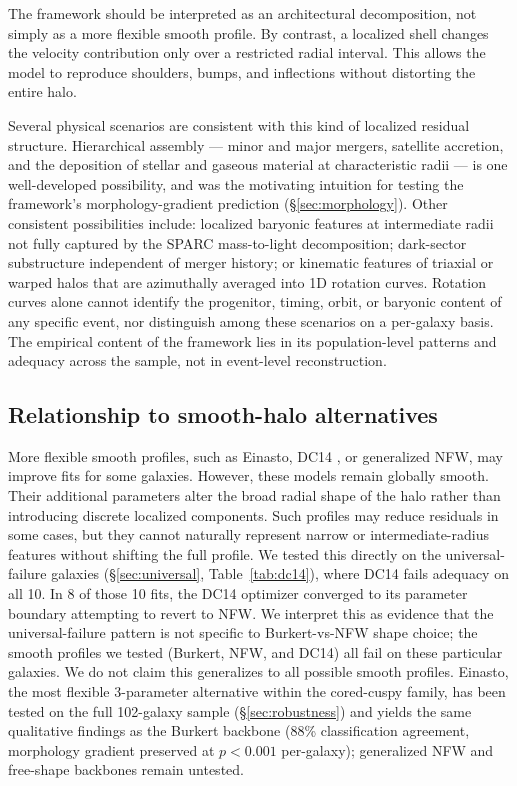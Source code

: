 The framework should be interpreted as an architectural decomposition, not simply as a more flexible smooth profile. By contrast, a localized shell changes the velocity contribution only over a restricted radial interval. This allows the model to reproduce shoulders, bumps, and inflections without distorting the entire halo.

Several physical scenarios are consistent with this kind of localized residual structure. Hierarchical assembly --- minor and major mergers, satellite accretion, and the deposition of stellar and gaseous material at characteristic radii --- is one well-developed possibility, and was the motivating intuition for testing the framework's morphology-gradient prediction (\S\ref{sec:morphology}). Other consistent possibilities include: localized baryonic features at intermediate radii not fully captured by the SPARC mass-to-light decomposition; dark-sector substructure independent of merger history; or kinematic features of triaxial or warped halos that are azimuthally averaged into 1D rotation curves. Rotation curves alone cannot identify the progenitor, timing, orbit, or baryonic content of any specific event, nor distinguish among these scenarios on a per-galaxy basis. The empirical content of the framework lies in its population-level patterns and adequacy across the sample, not in event-level reconstruction.

\subsection{Relationship to smooth-halo alternatives}

More flexible smooth profiles, such as Einasto, DC14 \citep{DiCintio2014a,DiCintio2014b}, or generalized NFW, may improve fits for some galaxies. However, these models remain globally smooth. Their additional parameters alter the broad radial shape of the halo rather than introducing discrete localized components. Such profiles may reduce residuals in some cases, but they cannot naturally represent narrow or intermediate-radius features without shifting the full profile. We tested this directly on the universal-failure galaxies (\S\ref{sec:universal}, Table~\ref{tab:dc14}), where DC14 fails adequacy on all 10. In 8 of those 10 fits, the DC14 optimizer converged to its parameter boundary attempting to revert to NFW. We interpret this as evidence that the universal-failure pattern is not specific to Burkert-vs-NFW shape choice; the smooth profiles we tested (Burkert, NFW, and DC14) all fail on these particular galaxies. We do not claim this generalizes to all possible smooth profiles. Einasto, the most flexible 3-parameter alternative within the cored-cuspy family, has been tested on the full 102-galaxy sample (\S\ref{sec:robustness}) and yields the same qualitative findings as the Burkert backbone (88\% classification agreement, morphology gradient preserved at $p < 0.001$ per-galaxy); generalized NFW and free-shape backbones remain untested.

